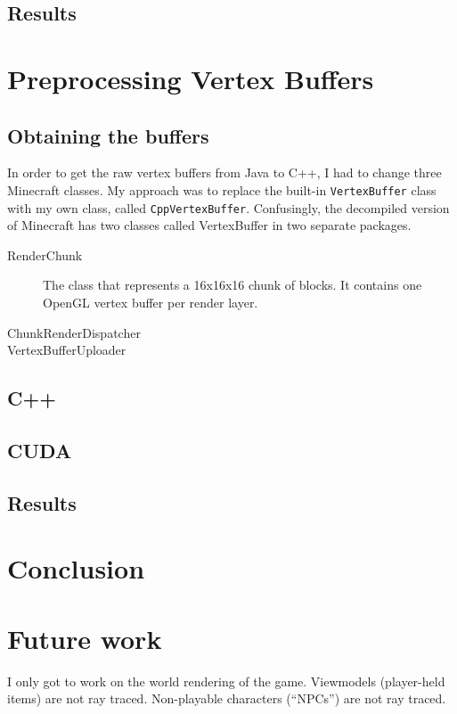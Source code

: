 \documentclass[]{article}
\begin{document}
\subsection{Results}


\section{Preprocessing Vertex Buffers}

\subsection{Obtaining the buffers}
In order to get the raw vertex buffers from Java to C++, I had to change three Minecraft classes.
My approach was to replace the built-in \texttt{VertexBuffer} class with my own class, called \texttt{CppVertexBuffer}.
Confusingly, the decompiled version of Minecraft has two classes called VertexBuffer in two separate packages.


\begin{description}
  \item[RenderChunk]
    The class that represents a 16x16x16 chunk of blocks.
    It contains one OpenGL vertex buffer per render layer.
  \item[ChunkRenderDispatcher]
  \item[VertexBufferUploader]
\end{description}

\subsection{C++}

\subsection{CUDA}

\subsection{Results}

\section{Conclusion}

\section{Future work}
I only got to work on the world rendering of the game.
Viewmodels (player-held items) are not ray traced.
Non-playable characters (\enquote{NPCs}) are not ray traced.
\end{document}
